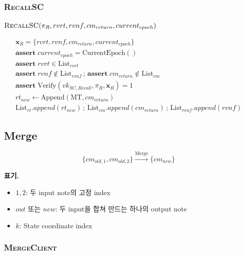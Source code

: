 \documentclass[11pt,a4paper]{extarticle}
\newcommand{\Verify}{\mathrm{Verify}}
\newcommand{\Append}{\mathrm{Append}}
\newcommand{\Assert}{\mathbf{assert}\;}
\newcommand{\List}[1]{\mathrm{List}_{#1}}
\newcommand{\MT}{\mathrm{MT}}
\newcommand{\CurrentEpoch}{\mathrm{CurrentEpoch}}
\newenvironment{schemeblock}
{%
  \begingroup
  \setlength{\jot}{8pt}%
  \setlength{\parskip}{0pt}%
  \setlength{\abovedisplayskip}{9pt}%
  \setlength{\belowdisplayskip}{0pt}%
  \setlength{\abovedisplayshortskip}{9pt}%
  \setlength{\belowdisplayshortskip}{0pt}%
  \begin{mdframed}[
    linewidth=0.4pt,
    linecolor=black,
    innerleftmargin=8pt,
    innerrightmargin=8pt,
    innertopmargin=8pt,
    innerbottommargin=8pt,
    skipabove=0pt,
    skipbelow=5pt,
    splittopskip=8pt,
    splitbottomskip=8pt
  ]
  \centering
}
{%
  \end{mdframed}
  \endgroup
}
\begin{document}
\subsubsection{\textsc{RecallSC}}

\begin{schemeblock}
\(
  \textsc{RecallSC}(
    \pi_R,rvrt,rvnf,cm_{return},current_{epoch})
\)

\begin{gather*}
  \mathbf{x}_R=\{rvrt,rvnf,cm_{return},current_{epoch}\}
  \\
  \Assert current_{epoch}=\CurrentEpoch()
  \\
  \Assert rvrt\in\List{rvrt}
  \\
  \Assert rvnf\notin\List{rvnf}
  \,;\,
  \Assert cm_{return}\notin\List{cm}
  \\
  \Assert
  \Verify(vk_{SC,Recall},\pi_R,\mathbf{x}_R)=1
  \\
  rt_{new}\gets\Append(\MT,cm_{return})
  \\
  \List{rt}.append(rt_{new})
  \,;\,
  \List{cm}.append(cm_{return})
  \,;\,
  \List{rvnf}.append(rvnf)
\end{gather*}
\end{schemeblock}

\subsection{Merge}

\[
  \{cm_{old,1},cm_{old,2}\}
  \xrightarrow{\mathrm{Merge}}
  \{cm_{new}\}
\]

\noindent\textbf{표기.}
\begin{itemize}[nosep]
  \item $1,2$: 두 input note의 고정 index
  \item $out$ 또는 $new$: 두 input을 합쳐 만드는 하나의 output note
  \item $k$: State coordinate index
\end{itemize}

\subsubsection{\textsc{MergeClient}}
\end{document}

